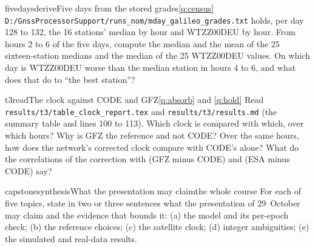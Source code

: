 \begin{question}{fivedays}{derive}{Five days from the stored grades}{\ref{q:census}}
\texttt{D:/GnssProcessorSupport/runs\_nom/mday\_galileo\_grades.txt} holds, per day
128 to 132, the 16 stations' median by hour and WTZZ00DEU by hour. From hours 2 to
6 of the five days, compute the median and the mean of the 25 sixteen-station
medians and the median of the 25 WTZZ00DEU values. On which day is WTZZ00DEU worse
than the median station in hours 4 to 6, and what does that do to ``the best
station''?
\end{question}

\begin{question}{t3}{read}{The clock against CODE and GFZ}{\ref{q:absorb} and \ref{q:hold}}
Read \texttt{results/t3/table\_clock\_report.tex} and \texttt{results/t3/results.md}
(the summary table and lines 100 to 113). Which clock is compared with which, over
which hours? Why is GFZ the reference and not CODE? Over the same hours, how does
the network's corrected clock compare with CODE's alone? What do the correlations
of the correction with (GFZ minus CODE) and (ESA minus CODE) say?
\end{question}

\begin{question}{capstone}{synthesis}{What the presentation may claim}{the whole course}
For each of five topics, state in two or three sentences what the presentation of
29~October may claim and the evidence that bounds it: (a) the model and its
per-epoch check; (b) the reference choices; (c) the satellite clock; (d) integer
ambiguities; (e) the simulated and real-data results.
\end{question}

